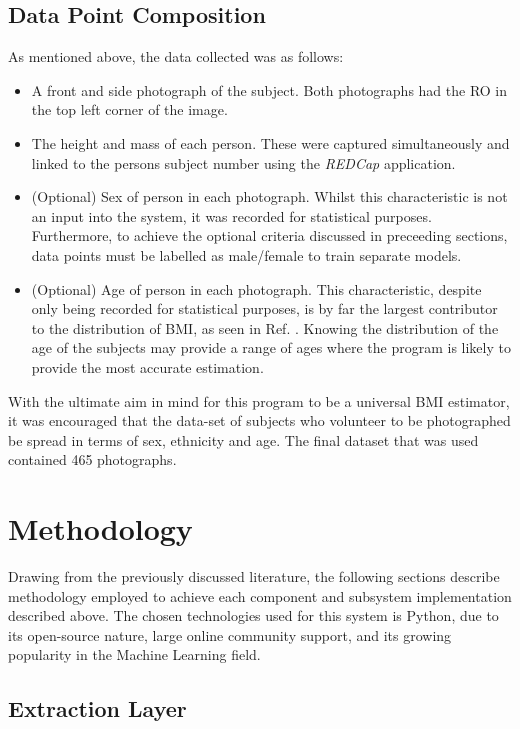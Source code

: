 \documentclass[conference]{IEEEtran}
\begin{document}
\subsection{Data Point Composition}
As mentioned above, the data collected was as follows:
\begin{itemize}
\item A front and side photograph of the subject.
Both photographs had the RO in the top left corner of the image.
\item The height and mass of each person.
These were captured simultaneously and linked to the persons subject number using the \textit{REDCap} application.
\item (Optional) Sex of person in each photograph.
Whilst this characteristic is not an input into the system, it was recorded for statistical purposes.
Furthermore, to achieve the optional criteria discussed in preceeding sections, data points must be labelled as male/female to train separate models.
\item (Optional) Age of person in each photograph.
This characteristic, despite only being recorded for statistical purposes, is by far the largest contributor to the distribution of BMI, as seen in Ref. \cite{bmiage}.
Knowing the distribution of the age of the subjects may provide a range of ages where the program is likely to provide the most accurate estimation.
\end{itemize}
With the ultimate aim in mind for this program to be a universal BMI estimator, it was encouraged that the data-set of subjects who volunteer to be photographed be spread in terms of sex, ethnicity and age.
The final dataset that was used contained 465 photographs.

\section{Methodology}
Drawing from the previously discussed literature, the following sections describe methodology employed to achieve each component and subsystem implementation described above.
The chosen technologies used for this system is Python, due to its open-source nature, large online community support, and its growing popularity in the Machine Learning field.
\subsection{Extraction Layer}
\end{document}
